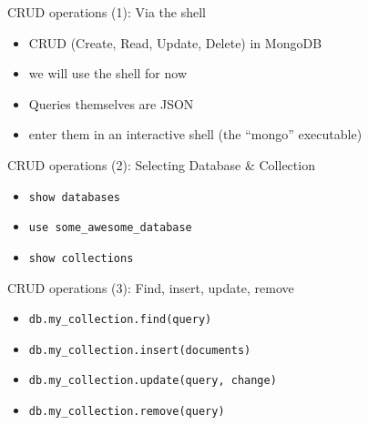 \begin{frame}{CRUD operations (1): Via the shell}
  \begin{itemize}
      \item CRUD (Create, Read, Update, Delete) in MongoDB
      \item we will use the shell for now
      \item Queries themselves are JSON
      \item enter them in an interactive shell (the ``mongo'' executable)
  \end{itemize}
\end{frame}

\begin{frame}[fragile]{CRUD operations (2): Selecting Database \& Collection}
  \begin{itemize}
    \item \lstinline[basicstyle=\ttfamily]{show databases}
    \item \lstinline[basicstyle=\ttfamily]{use some_awesome_database}
    \item \lstinline[basicstyle=\ttfamily]{show collections}
  \end{itemize}
\end{frame}

\begin{frame}[fragile]{CRUD operations (3): Find, insert, update, remove}
  \begin{itemize}
    \item \lstinline[basicstyle=\ttfamily]{db.my_collection.find(query)}
    \item \lstinline[basicstyle=\ttfamily]{db.my_collection.insert(documents)}
    \item \lstinline[basicstyle=\ttfamily]{db.my_collection.update(query, change)}
    \item \lstinline[basicstyle=\ttfamily]{db.my_collection.remove(query)}
  \end{itemize}
\end{frame}

